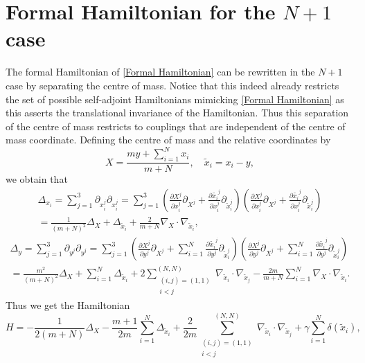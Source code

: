 \documentclass[a4paper,11pt]{article}
\newcommand{\dd}{\partial }
\begin{document}
\section{Formal Hamiltonian for the $ N+1 $ case}
The formal Hamiltonian of \eqref{Formal Hamiltonian} can be rewritten in the $ N+1 $ case by separating the centre of mass. Notice that this indeed already restricts the set of possible self-adjoint Hamiltonians mimicking \eqref{Formal Hamiltonian} as this asserts the translational invariance of the Hamiltonian. Thus this separation of the centre of mass restricts to couplings that are independent of the centre of mass coordinate. Defining the centre of mass and the relative coordinates by\begin{equation}
X=\frac{my+\sum_{i=1}^{N}x_i}{m+N}, \quad \tilde{x}_i=x_i-y,
\end{equation}
we obtain that \begin{equation}\begin{aligned}
\Delta_{x_i}=\sum_{j=1}^{3}\dd_{x^j_i}\dd_{x^j_i}=\sum_{j=1}^{3}\left(\frac{\dd X^j}{\dd x^j_{i}}\dd_{X^j}+\frac{\dd \tilde{x_i}^j}{\dd x_i^j}\dd_{\tilde{x}_i^j}\right)\left(\frac{\dd X^j}{\dd x^j_{i}}\dd_{X^j}+\frac{\dd \tilde{x_i}^j}{\dd x_i^j}\dd_{\tilde{x}_i^j}\right)\\
=\frac{1}{(m+N)^2}\Delta_{X}+\Delta_{\tilde{x}_i}+\frac{2}{m+N}\nabla_X\cdot\nabla_{\tilde{x}_i},
\end{aligned}
\end{equation}
\begin{equation}\begin{aligned}
\Delta_{y}=\sum_{j=1}^{3}\dd_{y^j}\dd_{y^j}=\sum_{j=1}^{3}\left(\frac{\dd X^j}{\dd y^j}\dd_{X^j}+\sum_{i=1}^{N}\frac{\dd \tilde{x_i}^j}{\dd y^j}\dd_{\tilde{x}_i^j}\right)\left(\frac{\dd X^j}{\dd y^j}\dd_{X^j}+\sum_{i=1}^{N}\frac{\dd \tilde{x_i}^j}{\dd y^j}\dd_{\tilde{x}_i^j}\right)\\
=\frac{m^2}{(m+N)^2}\Delta_{X}+\sum_{i=1}^{N}\Delta_{\tilde{x}_i}+2\sum_{\substack{(i,j)=(1,1)\\i<j}}^{(N,N)}\nabla_{\tilde{x}_i}\cdot\nabla_{\tilde{x}_j}-\frac{2m}{m+N}\sum_{i=1}^{N}\nabla_X\cdot\nabla_{\tilde{x}_i}.
\end{aligned}
\end{equation}
Thus we get the Hamiltonian \begin{equation}
H=-\frac{1}{2(m+N)}\Delta_X-\frac{m+1}{2m}\sum_{i=1}^{N}\Delta_{\tilde{x}_i}+\frac{2}{2m}\sum_{\substack{(i,j)=(1,1)\\i<j}}^{(N,N)}\nabla_{\tilde{x}_i}\cdot\nabla_{\tilde{x}_j}+\gamma\sum_{i=1}^{N}\delta(\tilde{x}_i),
\end{equation}
\end{document}
